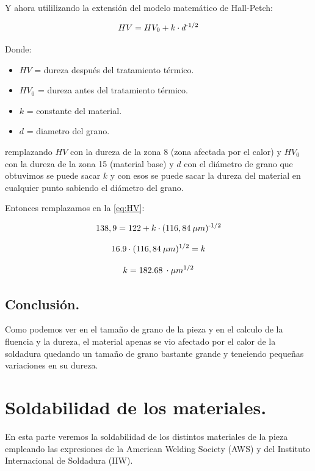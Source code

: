 \documentclass[12pt,a4paper]{article}
\begin{document}
Y ahora utililizando la extensión del modelo matemático de Hall-Petch:

\begin{equation}
    HV = HV_0 + k\cdot d \textsuperscript{-1/2}
    \label{eq:HV}
\end{equation}

Donde:

\begin{itemize}
    \item $\textit{HV}$ = dureza después del tratamiento térmico.
    \item $\textit{HV}_0$ = dureza antes del tratamiento térmico.
    \item $k$ = constante del material.
    \item $d$ = diametro del grano.
\end{itemize}
remplazando $\textit{HV}$ con la dureza de la zona 8 (zona afectada por el calor) y $\textit{HV}_0$ con la dureza de la zona 15 (material base) y $d$ con el diámetro de grano que obtuvimos se puede sacar $k$ y con esos se puede sacar la dureza del material en cualquier punto sabiendo el diámetro del grano.

Entonces remplazamos en la \autoref{eq:HV}:

\begin{equation}
   138,9 = 122 + k\cdot (116,84\: \mu m)\textsuperscript{-1/2}
\end{equation}

\begin{equation}
       16.9\cdot (116,84\: \mu m)\textsuperscript{1/2} = k
\end{equation}

\begin{equation}
       k = 182.68\: \cdot \mu m\textsuperscript{1/2}
\end{equation}

\subsection{Conclusión.}
Como podemos ver en el tamaño de grano de la pieza y en el calculo de la fluencia y la dureza, el material apenas se vio afectado por el calor de la soldadura quedando un tamaño de grano bastante grande y teneiendo pequeñas variaciones en su dureza.


\section{Soldabilidad de los materiales.}
En esta parte veremos la soldabilidad de los distintos materiales de la pieza empleando las expresiones de la American Welding Society
(AWS) y del Instituto Internacional de Soldadura (IIW).
\end{document}
